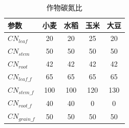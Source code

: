 \begin{table}[htbp]
  \centering
  \caption{作物碳氮比}
  \label{tab:作物碳氮比}
\begin{tabular}{@{}lcccc@{}}
\toprule
参数         & 小麦  & 水稻  & 玉米  & 大豆  \\ \midrule
$CN_{leaf}$     & 20  & 20  & 25  & 20  \\
$CN_{stem}$     & 50  & 50  & 50  & 50  \\
$CN_{root}$     & 42  & 42  & 42  & 42  \\
$CN_{leaf\_f}$  & 65  & 65  & 65  & 65  \\
$CN_{stem\_f}$  & 100 & 100 & 120 & 130 \\
$CN_{root\_f}$  & 40  & 40  & 0   & 0   \\
$CN_{grain\_f}$ & 50  & 50  & 50  & 50  \\ \bottomrule
\end{tabular}
\end{table}

%

%


